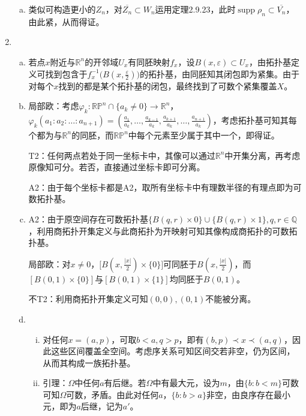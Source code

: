 \documentclass[a4paper,UTF8,fontset=windows]{ctexart}
\DeclareMathOperator{\supp}{supp}
\begin{document}
\begin{enumerate}[(1)]
\begin{enumerate}[(a)]
    \item
    类似可构造更小的$Z_n$，对$\overline{Z_n}\subset W_n$运用定理2.9.23，此时$\supp\rho_n\subset\overline{V_n}$，由此紧，从而得证。
    \end{enumerate}
    
    \item
    \begin{enumerate}[(a)]
    \item
    若点$x$附近与$\mathbb{R}^n$的开邻域$U_x$有同胚映射$f_x$，设$B(x,\varepsilon)\subset U_x$，由拓扑基定义可找到包含于$f_x^{-1}\big(B(x,\frac{\varepsilon}{2})\big)$的拓扑基，由同胚知其闭包即为紧集。由于对每个$x$找到的都是某个拓扑基的闭包，最终找到了可数个紧集覆盖$X$。
    
    \item
    局部欧：考虑$\varphi_k:\mathbb{R}\mathbb{P}^n\cap\{a_k\ne0\}\to\mathbb{R}^n$，$\varphi_k(a_1:a_2:\dots:a_{n+1})=(\frac{a_1}{a_k},\dots,\frac{a_{k-1}}{a_k},\frac{a_{k+1}}{a_k},\dots,\frac{a_{n+1}}{a_k})$，考虑拓扑基可知其每个都为与$\mathbb{R}^n$的同胚，而$\mathbb{R}\mathbb{P}^n$中每个元素至少属于其中一个，即得证。
    
    T2：任何两点若处于同一坐标卡中，其像可以通过$\mathbb{R}^n$中开集分离，再考虑原像知可分。若否，直接通过坐标卡即可分离。
    
    A2：由于每个坐标卡都是A2，取所有坐标卡中有理数半径的有理点即为可数拓扑基。
    
    \item
    A2：由于原空间存在可数拓扑基$\{B(q,r)\times0\}\cup\{B(q,r)\times1\},q,r\in\mathbb{Q}$，利用商拓扑开集定义与此商拓扑为开映射可知其像构成商拓扑的可数拓扑基。
    
    局部欧：对$x\ne0$，$\big[B(x,\frac{|x|}{2})\times\{0\}\big]$可同胚于$B(x,\frac{|x|}{2})$，而$[B(0,1)\times\{0\}]$与$[B(0,1)\times\{1\}]$均同胚于$B(0,1)$。
    
    不T2：利用商拓扑开集定义可知$(0,0),(0,1)$不能被分离。
    
    \item
    \begin{enumerate}[(i)]
    \item
    对任何$x=(a,p)$，可取$b<a,q>p$，即有$(b,p)\prec x\prec(a,q)$，因此这些区间覆盖全空间。考虑序关系可知区间交若非空，仍为区间，从而其构成一族拓扑基。
    
    \item
    引理：$\Omega$中任何$a$有后继。若$\Omega$中有最大元，设为$m$，由$\{b:b<m\}$可数可知$\Omega$可数，矛盾。由此对任何$a$，$\{b:b>a\}$非空，由良序存在最小元，即为$a$后继，记为$a'$。
    

\end{enumerate}
\end{enumerate}
\end{enumerate}
\end{document}
